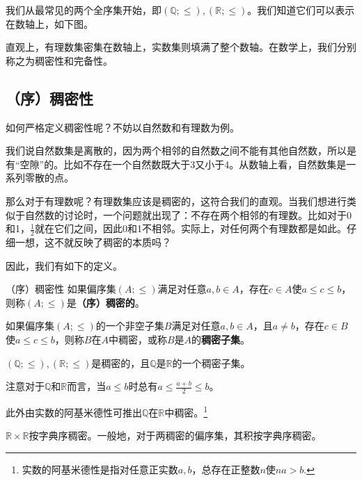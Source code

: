 
\begin{issues}
\issueDraft
\issueTODO
\end{issues}

我们从最常见的两个全序集开始，即$(\mathbb{Q};\leq),(\mathbb{R};\leq)$。我们知道它们可以表示在数轴上，如下图。


直观上，有理数集密集在数轴上，实数集则填满了整个数轴。在数学上，我们分别称之为稠密性和完备性。

\subsection{（序）稠密性}

如何严格定义稠密性呢？不妨以自然数和有理数为例。

我们说自然数集是离散的，因为两个相邻的自然数之间不能有其他自然数，所以是有“空隙”的。比如不存在一个自然数既大于3又小于4。从数轴上看，自然数集是一系列零散的点。

那么对于有理数呢？有理数集应该是稠密的，这符合我们的直观。当我们想进行类似于自然数的讨论时，一个问题就出现了：不存在两个相邻的有理数。比如对于0和1，$\frac{1}{2}$就在它们之间，因此0和1不相邻。实际上，对任何两个有理数都是如此。仔细一想，这不就反映了稠密的本质吗？

因此，我们有如下的定义。

\begin{definition}{（序）稠密性}
如果偏序集$(A;\leq)$满足对任意$a,b\in A$，存在$c\in A$使$a\leq c\leq b$，则称$(A;\leq)$是\textbf{（序）稠密的}。

如果偏序集$(A;\leq)$的一个非空子集$B$满足对任意$a,b\in A$，且$a\neq b$，存在$c\in B$使$a\leq c\leq b$，则称$B$在$A$中稠密，或称$B$是$A$的\textbf{稠密子集}。
\end{definition}

\begin{example}{}
$(\mathbb{Q};\leq),(\mathbb{R};\leq)$是稠密的，且$\mathbb{Q}$是$\mathbb{R}$的一个稠密子集。
\end{example}

注意对于$\mathbb{Q}$和$\mathbb{R}$而言，当$a\leq b$时总有$a\leq\frac{a+b}{2}\leq b$。

此外由实数的阿基米德性可推出$\mathbb{Q}$在$\mathbb{R}$中稠密。\footnote{实数的阿基米德性是指对任意正实数$a,b$，总存在正整数$n$使$na>b$.}

\begin{example}{}
$\mathbb{R}\times\mathbb{R}$按字典序稠密。一般地，对于两稠密的偏序集，其积按字典序稠密。
\end{example}

